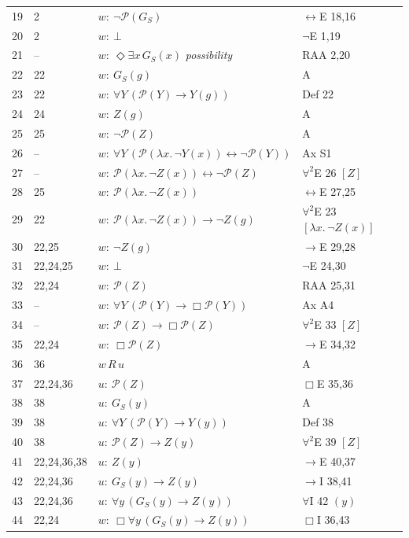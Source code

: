 {\begin{longtable}{@{}r>{\raggedright}p{}p{}>{\raggedright\arraybackslash}p{}@{}}
19 & 2 & $w:\ \neg \mathcal{P}(G_{\!S})$ & $\leftrightarrow$E 18,16\\
20 & 2 & $w:\ \bot$ & $\neg$E 1,19\\
21 & -- & $w:\ \Diamond \exists x\, G_{\!S}(x)$ \hfill{\itshape possibility} & RAA 2,20\\
22 & 22 & $w:\ G_{\!S}(g)$ & A\\
23 & 22 & $w:\ \forall Y\, (\mathcal{P}(Y) \to Y(g))$ & Def 22\\
24 & 24 & $w:\ Z(g)$ & A\\
25 & 25 & $w:\ \neg \mathcal{P}(Z)$ & A\\
26 & -- & $w:\ \forall Y\, (\mathcal{P}(\lambda x.\,\neg Y(x)) \leftrightarrow \neg \mathcal{P}(Y))$ & Ax S1\\
27 & -- & $w:\ \mathcal{P}(\lambda x.\,\neg Z(x)) \leftrightarrow \neg \mathcal{P}(Z)$ & $\forall^2$E 26 $[Z]$\\
28 & 25 & $w:\ \mathcal{P}(\lambda x.\,\neg Z(x))$ & $\leftrightarrow$E 27,25\\
29 & 22 & $w:\ \mathcal{P}(\lambda x.\,\neg Z(x)) \to \neg Z(g)$ & $\forall^2$E 23 $[\lambda x.\,\neg Z(x)]$\\
30 & 22,25 & $w:\ \neg Z(g)$ & $\to$E 29,28\\
31 & 22,24,25 & $w:\ \bot$ & $\neg$E 24,30\\
32 & 22,24 & $w:\ \mathcal{P}(Z)$ & RAA 25,31\\
33 & -- & $w:\ \forall Y\, (\mathcal{P}(Y) \to \Box \mathcal{P}(Y))$ & Ax A4\\
34 & -- & $w:\ \mathcal{P}(Z) \to \Box \mathcal{P}(Z)$ & $\forall^2$E 33 $[Z]$\\
35 & 22,24 & $w:\ \Box \mathcal{P}(Z)$ & $\to$E 34,32\\
36 & 36 & $w\,R\,u$ & A\\
37 & 22,24,36 & $u:\ \mathcal{P}(Z)$ & $\Box$E 35,36\\
38 & 38 & $u:\ G_{\!S}(y)$ & A\\
39 & 38 & $u:\ \forall Y\, (\mathcal{P}(Y) \to Y(y))$ & Def 38\\
40 & 38 & $u:\ \mathcal{P}(Z) \to Z(y)$ & $\forall^2$E 39 $[Z]$\\
41 & 22,24,36,38 & $u:\ Z(y)$ & $\to$E 40,37\\
42 & 22,24,36 & $u:\ G_{\!S}(y) \to Z(y)$ & $\to$I 38,41\\
43 & 22,24,36 & $u:\ \forall y\, (G_{\!S}(y) \to Z(y))$ & $\forall$I 42 $(y)$\\
44 & 22,24 & $w:\ \Box \forall y\, (G_{\!S}(y) \to Z(y))$ & $\Box$I 36,43\\

\end{longtable}}
